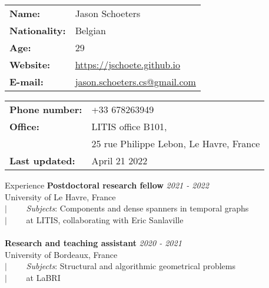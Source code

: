 \documentclass[french]{resume} %
\begin{document}
\begin{minipage}[t]{0.49\textwidth}
\begin{tabular}{ m{6em} m{15em} }
\textbf{Name:} & Jason Schoeters\\
\textbf{Nationality:} & Belgian\\
\textbf{Age:} & 29\\
\textbf{Website:} & \url{https://jschoete.github.io}\\
\textbf{E-mail: } & \href{mailto:jason.schoeters.cs@gmail.com}{jason.schoeters.cs@gmail.com}\\
\end{tabular}
\end{minipage} 
\begin{minipage}[t]{0.49\textwidth}
\begin{tabular}{ m{8em} m{20em} }
\textbf{Phone number: } & +33 678263949\\
\textbf{Office:} & LITIS office B101,\\
&25 rue Philippe Lebon,\newline 76063 Le Havre, France\\
\textbf{Last updated:} & April 21 2022
\end{tabular}
\end{minipage} 

\begin{rSection}{Experience}
	{\bf Postdoctoral research fellow} \hfill {\em 2021 - 2022} 
	\\ University of Le Havre, France
	\\ $| \qquad$ \textit{Subjects}: Components and dense spanners in temporal graphs
	\\ $| \qquad$ at LITIS, collaborating with Eric Sanlaville
	\\
	\\ {\bf Research and teaching assistant} \hfill {\em 2020 - 2021} 
	\\ University of Bordeaux, France
	\\ $| \qquad$ \textit{Subjects}: Structural and algorithmic geometrical problems
	\\ $| \qquad$ at LaBRI
\end{rSection}
\end{document}
